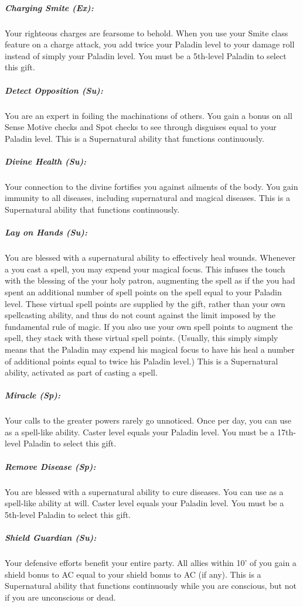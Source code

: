 \subparagraph{Charging Smite (Ex):}
Your righteous charges are fearsome to behold. When you use your Smite class feature on a charge attack, you add twice your Paladin level to your damage roll instead of simply your Paladin level. You must be a 5th-level Paladin to select this gift.

\subparagraph{Detect Opposition (Su):}
You are an expert in foiling the machinations of others. 
You gain a bonus on all Sense Motive checks and Spot checks to see through disguises equal to your Paladin level.
This is a Supernatural ability that functions continuously.

\subparagraph{Divine Health (Su):}
Your connection to the divine fortifies you against ailments of the body. You gain immunity to all diseases, including supernatural and magical diseases. This is a Supernatural ability that functions continuously.

\subparagraph{Lay on Hands (Su):}
You are blessed with a supernatural ability to effectively heal wounds. Whenever a you cast a  spell, you may expend your magical focus.
This infuses the touch with the blessing of the your holy patron, augmenting the spell as if the you had spent
an additional number of spell points on the spell equal to your Paladin level. 
These virtual spell points are supplied by the gift, rather than your own spellcasting ability, 
and thus do not count against the limit imposed by the fundamental rule of magic. 
If you also use your own spell points to augment the spell, they stack with these virtual spell points.
(Usually, this simply simply means that the Paladin may expend 
his magical focus to have his  heal a number of additional points equal to twice his Paladin level.)
This is a Supernatural ability, activated as part of casting a  spell.

\subparagraph{Miracle (Sp):}
Your calls to the greater powers rarely go unnoticed. Once per day, you can use  as a spell-like ability. Caster level equals your Paladin level.
You must be a 17th-level Paladin to select this gift.

\subparagraph{Remove Disease (Sp):}
You are blessed with a supernatural ability to cure diseases. You can use  as a spell-like ability at will. Caster level equals your Paladin level.
You must be a 5th-level Paladin to select this gift.

\subparagraph{Shield Guardian (Su):}
Your defensive efforts benefit your entire party. All allies within 10' of you gain a shield bonus to AC equal to your shield bonus to AC (if any).
This is a Supernatural ability that functions continuously while you are conscious, but not if you are unconscious or dead.

